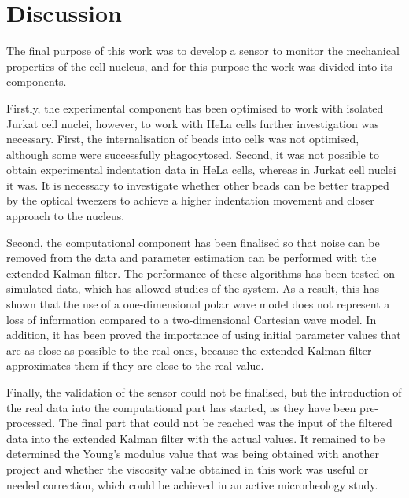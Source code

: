 \documentclass[12pt, a4paper]{article} %
\begin{document}
\newpage

\setlength{\parskip}{0mm}


\section{Discussion}

The final purpose of this work was to develop a sensor to monitor the mechanical properties of the cell nucleus, and for this purpose the work was divided into its components. 

\setlength{\parskip}{4mm}

Firstly, the experimental component has been optimised to work with isolated Jurkat cell nuclei, however, to work with HeLa cells further investigation was necessary. First, the internalisation of beads into cells was not optimised, although some were successfully phagocytosed. Second, it was not possible to obtain experimental indentation data in HeLa cells, whereas in Jurkat cell nuclei it was. It is necessary to investigate whether other beads can be better trapped by the optical tweezers to achieve a higher indentation movement and closer approach to the nucleus.

Second, the computational component has been finalised so that noise can be removed from the data and parameter estimation can be performed with the extended Kalman filter. The performance of these algorithms has been tested on simulated data, which has allowed studies of the system. As a result, this has shown that the use of a one-dimensional polar wave model does not represent a loss of information compared to a two-dimensional Cartesian wave model. 
In addition, it has been proved the importance of using initial parameter values that are as close as possible to the real ones, because the extended Kalman filter approximates them if they are close to the real value.

Finally, the validation of the sensor could not be finalised, but the introduction of the real data into the computational part has started, as they have been pre-processed. The final part that could not be reached was the input of the filtered data into the extended Kalman filter with the actual values. It remained to be determined the Young's modulus value that was being obtained with another project and whether the viscosity value obtained in this work was useful or needed correction, which could be achieved in an active microrheology study. 
\end{document}
